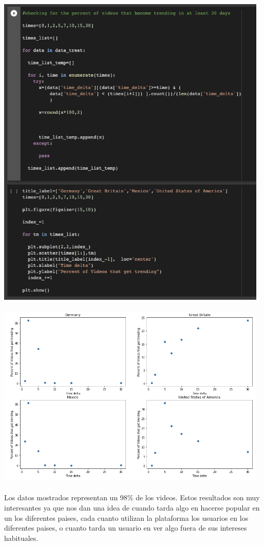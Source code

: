 \documentclass[a4paper,12pt]{article}
\begin{document}
\includegraphics[width=13cm]{plot_freq_code.png}
\\
\\ 
\includegraphics[width=13cm]{plot_freq_perc.png}
\\
\\
Los datos mostrados representan un 98\% de los videos. Estos resultados son muy interesantes ya que nos dan una idea de cuando tarda algo en hacerse popular en un los diferentes paises, cada cuanto utilizan la plataforma los usuarios en los diferentes paises, o cuanto tarda un usuario en ver algo fuera de sus intereses habituales.
\end{document}

